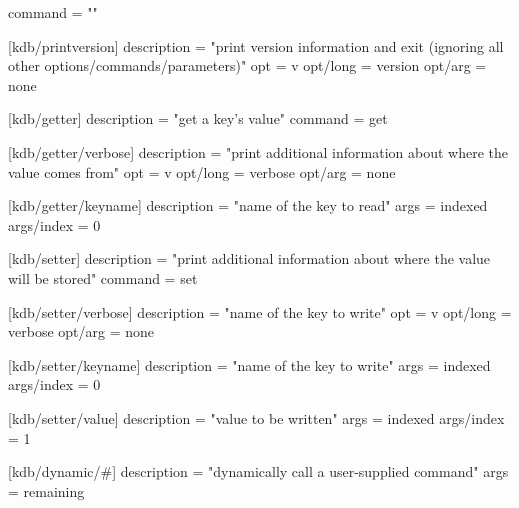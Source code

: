 \begin{DoxyCode}
[kdb]
command = ""

[kdb/printversion]
description = "print version information and exit (ignoring all other options/commands/parameters)"
opt = v
opt/long = version
opt/arg = none

[kdb/getter]
description = "get a key's value"
command = get

[kdb/getter/verbose]
description = "print additional information about where the value comes from"
opt = v
opt/long = verbose
opt/arg = none

[kdb/getter/keyname]
description = "name of the key to read"
args = indexed
args/index = 0

[kdb/setter]
description = "print additional information about where the value will be stored"
command = set

[kdb/setter/verbose]
description = "name of the key to write"
opt = v
opt/long = verbose
opt/arg = none

[kdb/setter/keyname]
description = "name of the key to write"
args = indexed
args/index = 0

[kdb/setter/value]
description = "value to be written"
args = indexed
args/index = 1

[kdb/dynamic/#]
description = "dynamically call a user-supplied command"
args = remaining
\end{DoxyCode}



